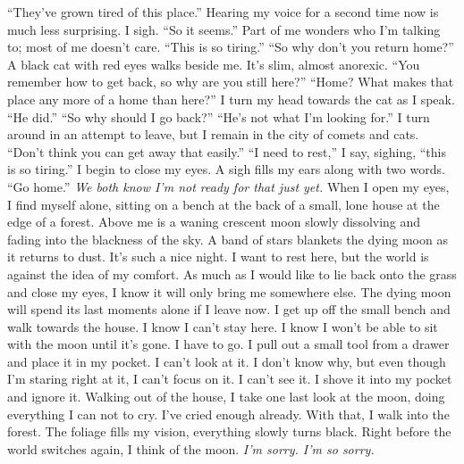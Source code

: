 \documentclass[a4paper, 12pt]{book}
\newcommand\tab[1][1cm]{\hspace*{#1}}
\begin{document}
\newline
\tab
``They’ve grown tired of this place.'' Hearing my voice for a second time now is much less surprising.
\newline
\tab
I sigh. ``So it seems.'' Part of me wonders who I’m talking to; most of me doesn’t care. ``This is so tiring.''
\newline
\tab
``So why don’t you return home?'' A black cat with red eyes walks beside me. It’s slim, almost anorexic. ``You remember how to get back, so why are you still here?''
\newline
\tab
``Home? What makes that place any more of a home than here?'' I turn my head towards the cat as I speak.
\newline
\tab
``He did.''
\newline
\tab
``So why should I go back?''
\newline
\tab
``He’s not what I’m looking for.'' I turn around in an attempt to leave, but I remain in the city of comets and cats.
\newline
\tab
``Don’t think you can get away that easily.''
\newline
\tab
``I need to rest,'' I say, sighing, ``this is so tiring.''
\newline
\tab
I begin to close my eyes. A sigh fills my ears along with two words. ``Go home.'' \textit{We both know I’m not ready for that just yet.}
\newline
\tab
When I open my eyes, I find myself alone, sitting on a bench at the back of a small, lone house at the edge of a forest. Above me is a waning crescent moon slowly dissolving and fading into the blackness of the sky. A band of stars blankets the dying moon as it returns to dust. It’s such a nice night. I want to rest here, but the world is against the idea of my comfort. As much as I would like to lie back onto the grass and close my eyes, I know it will only bring me somewhere else. The dying moon will spend its last moments alone if I leave now.
\newline
\tab
I get up off the small bench and walk towards the house. I know I can’t stay here. I know I won’t be able to sit with the moon until it’s gone. I have to go. I pull out a small tool from a drawer and place it in my pocket. I can’t look at it. I don’t know why, but even though I’m staring right at it, I can’t focus on it. I can’t see it. I shove it into my pocket and ignore it. Walking out of the house, I take one last look at the moon, doing everything I can not to cry. I’ve cried enough already. With that, I walk into the forest. The foliage fills my vision, everything slowly turns black. Right before the world switches again, I think of the moon. \textit{I’m sorry. I’m so sorry.}
\end{document}
